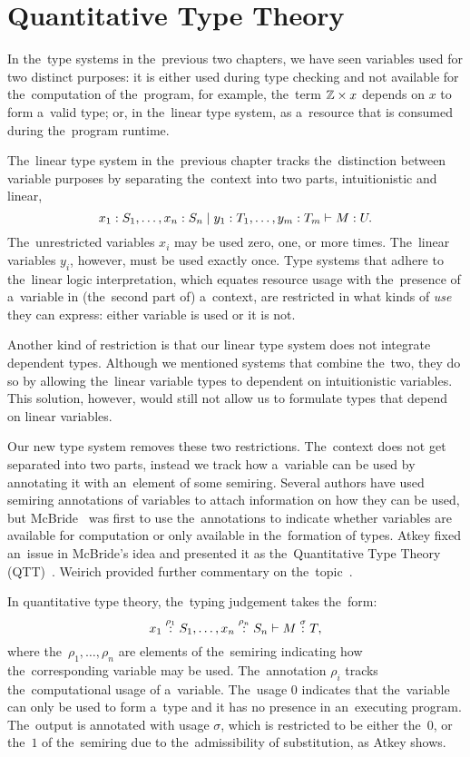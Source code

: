 \chapter{Quantitative Type Theory}\label{cha:qtt}

In the~type systems in the~previous two chapters, we have seen variables used
for two distinct purposes: it is either used during type checking and not
available for the~computation of the~program, for example, the~term $\mathbb{Z} \times
x$ depends on $x$ to form a~valid type; or, in the~linear type system, as
a~resource that is consumed during the~program runtime.

The~linear type system in the~previous chapter tracks the~distinction between
variable purposes by separating the~context into two parts, intuitionistic and
linear,
\[
  x_1 \stackrel{}: S_1, \dotsc, x_n \stackrel{}: S_n \mid y_1 \stackrel{}: T_1, \dotsc, y_m \stackrel{}: T_m
    \vdash M \stackrel{}: U.
\]
The~unrestricted variables $x_i$ may be used zero, one, or more times.
The~linear variables $y_i$, however, must be used exactly once. Type systems
that adhere to the~linear logic interpretation, which equates resource usage
with the~presence of a~variable in (the~second part of) a~context, are
restricted in what kinds of \emph{use} they can express: either variable is used
or it is not.

Another kind of restriction is that our linear type system does not integrate
dependent types. Although we mentioned systems that combine the~two, they do so
by allowing the~linear variable types to dependent on intuitionistic variables.
This solution, however, would still not allow us to formulate types that depend
on linear variables.

Our new type system removes these two restrictions. The~context does not get
separated into two parts, instead we track how a~variable can be used by
annotating it with an~element of some semiring. Several authors have used
semiring annotations of variables to attach information on how they can be used,
but McBride~\cite{mcbride_2016} was first to use the~annotations to indicate
whether variables are available for computation or only available in
the~formation of types. Atkey fixed an~issue in McBride's idea and presented it
as the~Quantitative Type Theory (QTT)~\cite{atkey_2018}. Weirich provided
further commentary on the~topic~\cite{weirich_2020}.


In quantitative type theory, the~typing judgement takes the~form:
\[
  x_1 \stackrel{\rho_1}: S_1, \dotsc, x_n \stackrel{\rho_n}: S_n \vdash M \stackrel{\sigma}: T,
\]
where the~$\rho_1, \dotsc, \rho_n$ are elements of the~semiring indicating
how the~corresponding variable may be used. The~annotation $\rho_i$ tracks
the~computational usage of a~variable. The~usage $0$ indicates that the~variable
can only be used to form a~type and it has no presence in an~executing program.
The~output is annotated with usage $\sigma$, which is restricted to be either
the~$0$, or the~$1$ of the~semiring due to the~admissibility of substitution, as
Atkey shows.

